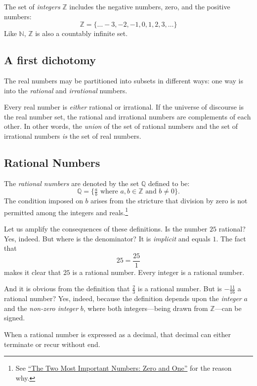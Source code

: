 \documentclass[
  a4paper,
]{article}
\begin{document}
The set of \emph{integers} \(\mathbb{Z}\) includes the negative numbers,
zero, and the positive numbers: \[
\mathbb{Z} = \{\ldots -3, -2, -1, 0, 1, 2, 3, \dots\}
\] Like \(\mathbb{N}\), \(\mathbb{Z}\) is also a countably infinite set.

\subsection{A first dichotomy}\label{a-first-dichotomy}

The real numbers may be partitioned into subsets in different ways: one
way is into the \emph{rational} and \emph{irrational} numbers.

Every real number is \emph{either} rational or irrational. If the
universe of discourse is the real number set, the rational and
irrational numbers are complements of each other. In other words, the
\emph{union} of the set of rational numbers and the set of irrational
numbers \emph{is} the set of real numbers.

\subsection{Rational Numbers}\label{rational-numbers}

The \emph{rational numbers} are denoted by the set \(\mathbb{Q}\)
defined to be: \[
\mathbb{Q} = \{\tfrac{a}{b} \mbox{ where } a, b \in \mathbb{Z} \mbox{ and } b \neq 0\}.
\] The condition imposed on \(b\) arises from the stricture that
division by zero is not permitted among the integers and
reals.\footnote{See
  \href{https://swanlotus.netlify.app/blogs/the-two-most-important-numbers-zero-and-one}{``The
  Two Most Important Numbers: Zero and One''} for the reason why.}

Let us amplify the consequences of these definitions. Is the number
\(25\) rational? Yes, indeed. But where is the denominator? It is
\emph{implicit} and equals \(1\). The fact that \[
25 = \frac{25}{1}
\] makes it clear that \(25\) is a rational number. Every integer is a
rational number.

And it is obvious from the definition that \(\frac{2}{3}\) is a rational
number. But is \(-\frac{11}{16}\) a rational number? Yes, indeed,
because the definition depends upon the \emph{integer} \(a\) and the
\emph{non-zero integer} \(b\), where both integers---being drawn from
\(\mathbb{Z}\)---can be signed.

When a rational number is expressed as a decimal, that decimal can
either terminate or recur without end.
\end{document}
